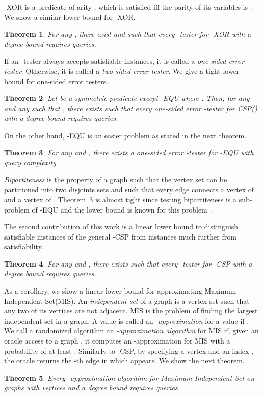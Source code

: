 \documentclass[letterpaper,11pt]{article}
\newtheorem{theorem}{Theorem}[section]
\newcommand{\mislong}{\textsf{Maximum Independent Set}\xspace}
\newcommand{\mis}{\textsf{MIS}\xspace}
\newcommand{\kcsp}{\textsf{-CSP}\xspace}
\newcommand{\csp}[1]{\textsf{CSP}(#1)\xspace}
\newcommand{\equ}{\textsf{EQU}\xspace}
\newcommand{\txor}{\textsf{-XOR}\xspace}
\newcommand{\kxor}{-\textsf{XOR}\xspace}
\newcommand{\kequ}{-\textsf{EQU}\xspace}
\begin{document}
\kxor is a predicate of arity , 
which is satisfied iff the parity of its variables is .
We show a similar lower bound for \txor.
\begin{theorem}\label{thr:txor}
  For any ,
  there exist  and  such that every -tester for \txor with a degree bound  requires  queries.
\end{theorem}

If an -tester always accepts satisfiable instances,
it is called a \textit{one-sided error tester}.
Otherwise, it is called a \textit{two-sided error tester}.
We give a tight lower bound for one-sided error testers.
\begin{theorem}\label{thr:one-sided}
  Let  be a symmetric predicate except \kequ where .
  Then, for any  and any  such that ,
  there exists  such that
  every one-sided error -tester for \csp{} with a degree bound  requires  queries.
\end{theorem}

On the other hand,
\kequ is an easier problem as stated in the next theorem.
\begin{theorem}\label{thr:equ}
  For any  and ,
  there exists a one-sided error -tester for \kequ with query complexity .
\end{theorem}
\textit{Bipartiteness} is the property of a graph such that the vertex set can be partitioned into two disjoints sets  and  such that every edge connects a vertex of  and a vertex of .
Theorem~\ref{thr:equ} is almost tight since testing bipartiteness is a sub-problem of -\equ and the  lower bound is known for this problem~\cite{GR08}.

The second contribution of this work is a linear lower bound to distinguish satisfiable instances of the general \kcsp from instances much further from satisfiability.
\begin{theorem}\label{thr:kcsp}
  For any  and , 
  there exists  such that 
  every -tester for \kcsp with a degree bound  requires  queries.
\end{theorem}
As a corollary, we show a linear lower bound for approximating \mislong (\mis).
An {\it independent set} of a graph is a vertex set such that any two of its vertices are not adjacent.
\mis is the problem of finding the largest independent set in a graph.
A value  is called an \textit{-approximation} for a value  if .
We call a randomized algorithm an \textit{-approximation algorithm} for \mis if,
given an oracle access  to a graph ,
it computes an -approximation for \mis with a probability of at least .
Similarly to \kcsp, 
by specifying a vertex  and an index ,
the oracle  returns the -th edge in which  appears.
We show the next theorem.
\begin{theorem}\label{thr:mis}
  Every -approximation algorithm for \mislong on graphs with  vertices and a degree bound  requires  queries.
\end{theorem}
\end{document}
